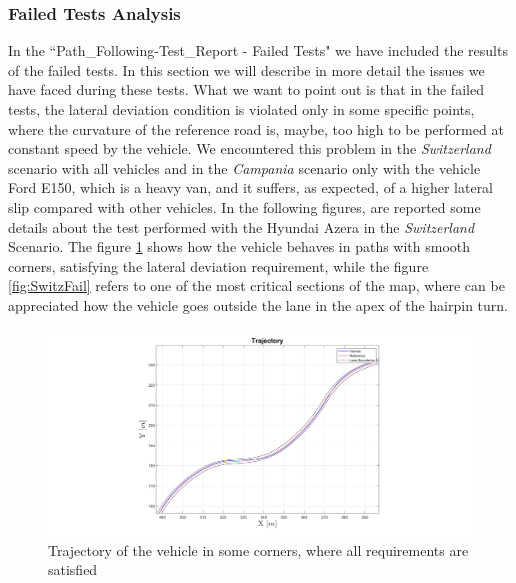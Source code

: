 \subsubsection{Failed Tests Analysis}
In the ``Path\_Following-Test\_Report - Failed Tests" we have included the results of the failed tests. In this section we will describe in more detail the issues we have faced during these tests.
What we want to point out is that in the failed tests, the lateral deviation condition is violated only in some specific points, where the curvature of the reference road is, maybe, too high to be performed at constant speed by the vehicle. We encountered this problem in the \textit{Switzerland} scenario with all vehicles and in the \textit{Campania} scenario only with the vehicle Ford E150, which is a heavy van, and it suffers, as expected, of a higher lateral slip compared with other vehicles.
In the following figures, are reported some details about the test performed with the Hyundai Azera in the \textit{Switzerland} Scenario. The figure \ref{fig:SwitzPass} shows how the vehicle behaves in paths with smooth corners, satisfying the lateral deviation requirement, while the figure \ref{fig:SwitzFail} refers to one of the most critical sections of the map, where can be appreciated how the vehicle goes outside the lane in the apex of the hairpin turn.


    \begin{figure}[H]
    \centering
    \includegraphics[width=1\textwidth]{Figures/Switz_pass.png}
    \caption{Trajectory of the vehicle in some corners, where all requirements are satisfied}
      \label{fig:SwitzPass}
\end{figure}

